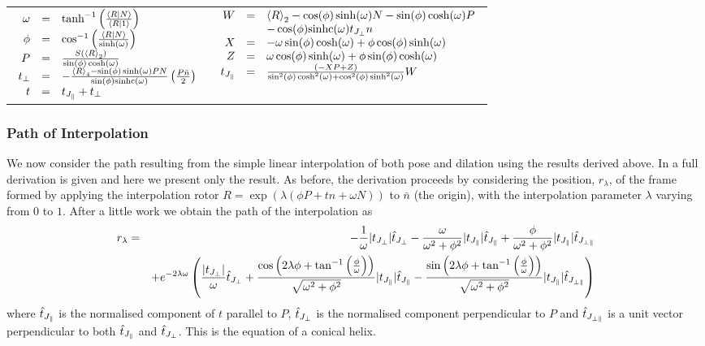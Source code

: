 \begin{tabular}{ll}
$\begin{array}{rcl}
  \omega &=& \tanh^{-1}\left(\frac{\left<R|N\right>}{\left<R|1\right>}\right)\\
  \phi &=& \cos^{-1}\left(\frac{\left<R|N\right>}{\sinh(\omega)}\right)\\
  P &=& \frac{S(\left<R\right>_2)}{\sin(\phi)\cosh(\omega)}\\
  t_\perp &=& -\frac{\left<R\right>_4-\sin(\phi)\sinh(\omega)PN}{\sin(\phi)\mathrm{sinhc}(\omega)}\left(\frac{P\bar{n}}2\right)\\
  t &=& t_{J_\parallel} + t_\perp
\end{array}$ &
$\begin{array}{rcl}
  W &=& \left<R\right>_2 - \cos(\phi)\sinh(\omega)N - \sin(\phi)\cosh(\omega)P \\
  &&- \cos(\phi)\mathrm{sinhc}(\omega)t_{J_\perp} n\\
  X &=& -\omega\sin(\phi)\cosh(\omega) + \phi\cos(\phi)\sinh(\omega)\\
  Z &=&  \omega\cos(\phi)\sinh(\omega) + \phi\sin(\phi)\cosh(\omega)\\
  t_{J_\parallel} &=& \frac{(-XP+Z)}{\sin^2(\phi)\cosh^2(\omega) + \cos^2(\phi)\sinh^2(\omega)} W
\end{array}$
\end{tabular}

\subsubsection{Path of Interpolation}

We now consider the path resulting from the simple linear interpolation of both
pose and dilation using the results derived above.  In \cite{jic23fyr} a full
derivation is given and here we present only the result. As before, the
derivation proceeds by considering the position, $r_\lambda$, of the frame
formed by applying the interpolation rotor $R=\exp(\lambda(\phi P + tn +
\omega N))$ to $\bar{n}$ (the origin), with the interpolation parameter
$\lambda$ varying from $0$ to $1$. After a little work we obtain the path
of the interpolation as
\begin{eqnarray}
r_\lambda &=& -\frac{1}{\omega}|t_{J_\perp}| \hat{t}_{J_\perp} - \frac{\omega}{\omega^2 + \phi^2}|t_{J_\parallel}|\hat{t}_{J_\parallel} + \frac{\phi}{\omega^2 + \phi^2}|t_{J_\parallel}|\hat{t}_{J_{\perp\parallel}}\nonumber\\
&&+e^{-2\lambda\omega}\left(\frac{|t_{J_\perp}|}{\omega}\hat{t}_{J_\perp} + \frac{\cos\left(2\lambda\phi+\tan^{-1}\left(\frac{\phi}{\omega}\right)\right)}{\sqrt{\omega^2 + \phi^2}}|t_{J_\parallel}|\hat{t}_{J_\parallel} - \frac{\sin\left(2\lambda\phi + \tan^{-1}\left(\frac{\phi}{\omega}\right)\right)}{\sqrt{\omega^2 + \phi^2}}|t_{J_\parallel}|\hat{t}_{J_{\perp\parallel}}\right)\nonumber\\
\end{eqnarray}
where $\hat{t}_{J_\parallel}$ is the normalised component of $t$ parallel to $P$,
$\hat{t}_{J_\perp}$ is the normalised component perpendicular to $P$ and
$\hat{t}_{J_{\perp\parallel}}$ is a unit vector perpendicular to both $\hat{t}_{J_\parallel}$ and
$\hat{t}_{J_\perp}$.  This is the equation of a conical helix.


